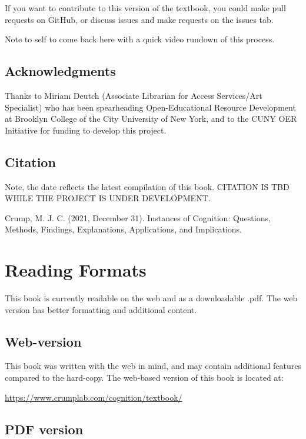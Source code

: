 \documentclass[
  oneside,
  12pt]{crumpbook}
\begin{document}
If you want to contribute to this version of the textbook, you could make pull requests on GitHub, or discuss issues and make requests on the issues tab.

Note to self to come back here with a quick video rundown of this process.

\hypertarget{acknowledgments}{%
\section{Acknowledgments}\label{acknowledgments}}

Thanks to Miriam Deutch (Associate Librarian for Access Services/Art Specialist) who has been spearheading Open-Educational Resource Development at Brooklyn College of the City University of New York, and to the CUNY OER Initiative for funding to develop this project.

\hypertarget{citation}{%
\section{Citation}\label{citation}}

Note, the date reflects the latest compilation of this book. CITATION IS TBD WHILE THE PROJECT IS UNDER DEVELOPMENT.

Crump, M. J. C. (2021, December 31). Instances of Cognition: Questions, Methods, Findings, Explanations, Applications, and Implications.

\hypertarget{reading-formats}{%
\chapter*{Reading Formats}\label{reading-formats}}

This book is currently readable on the web and as a downloadable .pdf. The web version has better formatting and additional content.

\hypertarget{web-version}{%
\section{Web-version}\label{web-version}}

This book was written with the web in mind, and may contain additional features compared to the hard-copy. The web-based version of this book is located at:

\url{https://www.crumplab.com/cognition/textbook/}

\hypertarget{pdf-version}{%
\section{PDF version}\label{pdf-version}}
\end{document}
